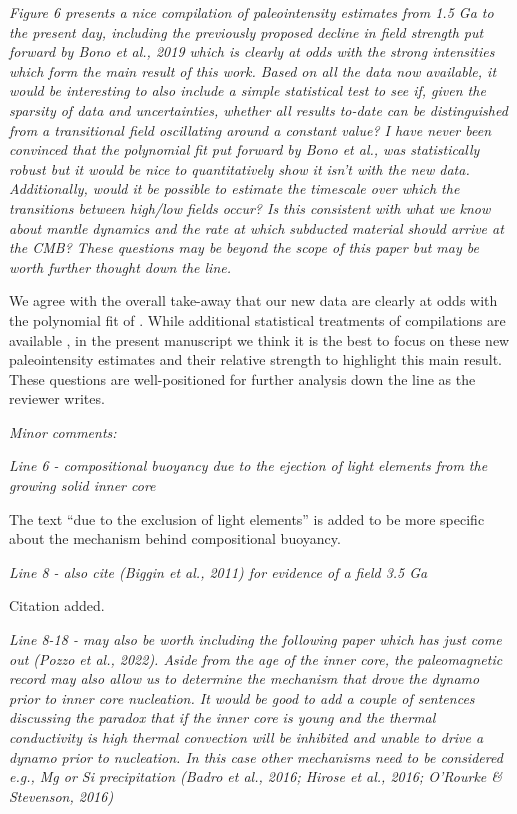 \documentclass[11pt, letterpaper]{article}
\begin{document}
\begin{flushleft}
\itshape
Figure 6 presents a nice compilation of paleointensity estimates from 1.5 Ga to the present day, including the previously proposed decline in field strength put forward by Bono et al., 2019 which is clearly at odds with the strong intensities which form the main result of this work. Based on all the data now available, it would be interesting to also include a simple statistical test to see if, given the sparsity of data and uncertainties, whether all results to-date can be distinguished from a transitional field oscillating around a constant value? I have never been convinced that the polynomial fit put forward by Bono et al., was statistically robust but it would be nice to quantitatively show it isn't with the new data. Additionally, would it be possible to estimate the timescale over which the transitions between high/low fields occur? Is this consistent with what we know about mantle dynamics and the rate at which subducted material should arrive at the CMB? These questions may be beyond the scope of this paper but may be worth further thought down the line.
\upshape

We agree with the overall take-away that our new data are clearly at odds with the polynomial fit of \cite{Bono2019a}. While additional statistical treatments of compilations are available \cite[e.g.][]{Biggin2015a}, in the present manuscript we think it is the best to focus on these new paleointensity estimates and their relative strength to highlight this main result. These questions are well-positioned for further analysis down the line as the reviewer writes.


\itshape
Minor comments:
\upshape

\textit{Line 6 - compositional buoyancy due to the ejection of light elements from the growing solid inner core}

The text ``due to the exclusion of light elements'' is added to be more specific about the mechanism behind compositional buoyancy.

\textit{Line 8 - also cite (Biggin et al., 2011) for evidence of a field 3.5 Ga}

Citation added. 

\textit{Line 8-18 - may also be worth including the following paper which has just come out (Pozzo et al., 2022). Aside from the age of the inner core, the paleomagnetic record may also allow us to determine the mechanism that drove the dynamo prior to inner core nucleation. It would be good to add a couple of sentences discussing the paradox that if the inner core is young and the thermal conductivity is high thermal convection will be inhibited and unable to drive a dynamo prior to nucleation. In this case other mechanisms need to be considered e.g., Mg or Si precipitation (Badro et al., 2016; Hirose et al., 2016; O'Rourke \& Stevenson, 2016)}


\end{flushleft}
\end{document}
